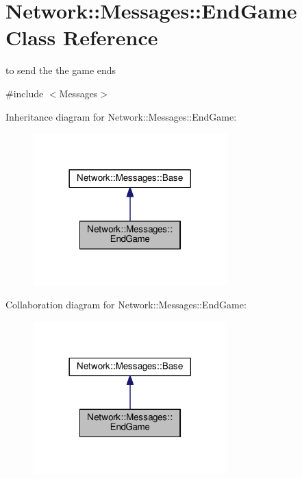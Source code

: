 \hypertarget{class_network_1_1_messages_1_1_end_game}{}\section{Network\+:\+:Messages\+:\+:End\+Game Class Reference}
\label{class_network_1_1_messages_1_1_end_game}


to send the the game ends  




{\ttfamily \#include $<$Messages$>$}



Inheritance diagram for Network\+:\+:Messages\+:\+:End\+Game\+:
\nopagebreak
\begin{figure}[H]
\begin{center}
\leavevmode
\includegraphics[width=213pt]{class_network_1_1_messages_1_1_end_game__inherit__graph}
\end{center}
\end{figure}


Collaboration diagram for Network\+:\+:Messages\+:\+:End\+Game\+:
\nopagebreak
\begin{figure}[H]
\begin{center}
\leavevmode
\includegraphics[width=213pt]{class_network_1_1_messages_1_1_end_game__coll__graph}
\end{center}
\end{figure}

